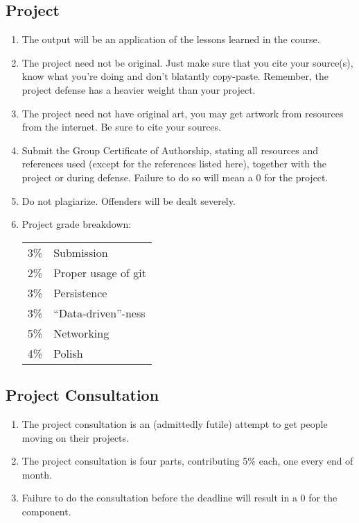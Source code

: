 \documentclass[10pt]{article}
\begin{document}
\subsection{Project}
\begin{enumerate}[noitemsep]
\item The output will be an application of the lessons learned in the course.
\item The project need not be original. Just make sure that you cite your source(s), know what you're doing and don't blatantly copy-paste. Remember, the project defense has a heavier weight than your project.
\item The project need not have original art, you may get artwork from resources from the internet. Be sure to cite your sources.
\item Submit the Group Certificate of Authorship, stating all resources and references used (except for the references listed here), together with the project or during defense. Failure to do so will mean a 0 for the project.
\item Do not plagiarize. Offenders will be dealt severely.
\item Project grade breakdown:
\begin{center}
\begin{tabular}{rl}
3\% & Submission\\
2\% & Proper usage of git\\
3\% & Persistence\\
3\% & ``Data-driven''-ness\\
5\% & Networking\\
4\% & Polish\\
\end{tabular}
\end{center}
\end{enumerate}

\subsection{Project Consultation}
\begin{enumerate}[noitemsep]
\item The project consultation is an (admittedly futile) attempt to get people moving on their projects.
\item The project consultation is four parts, contributing 5\% each, one every end of month.
\item Failure to do the consultation before the deadline will result in a 0 for the component.
\end{enumerate}
\end{document}
